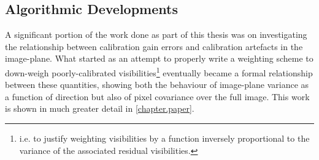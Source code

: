 %

\subsection{Algorithmic Developments}

\pg
A significant portion of the work done as part of this thesis was on investigating the relationship between calibration gain errors and calibration artefacts in the image-plane. What started as an attempt to properly write a weighting scheme to down-weigh poorly-calibrated visibilities\footnote{i.e. to justify weighting visibilities by a function inversely proportional to the variance of the associated residual visibilities.} eventually became a formal relationship between these quantities, showing both the behaviour of image-plane variance as a function of direction but also of pixel covariance over the full image. This work is shown in much greater detail in \cref{chapter.paper}.

